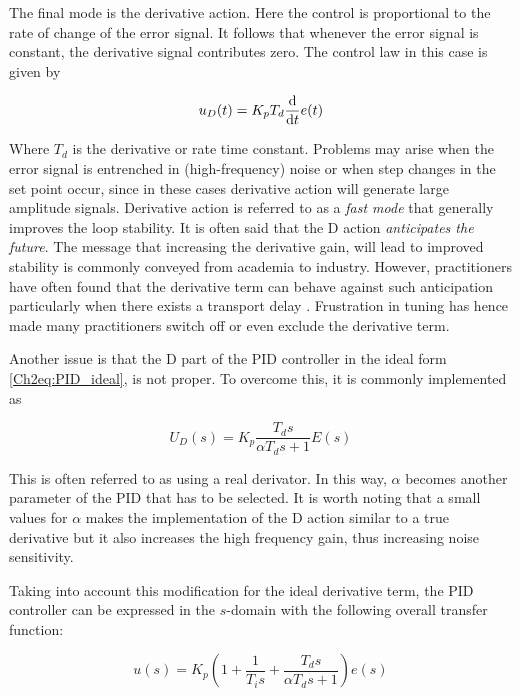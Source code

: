 The final mode is the derivative  action. Here the control is proportional to the rate of change of the error signal. It follows that whenever the error signal is constant, the derivative signal contributes zero. The control law in this case is given by

\[u_D(t) = K_pT_d \frac{\mathrm{d}}{\mathrm{d} t}e(t)\]

Where $T_d$ is the derivative or rate time constant. Problems may arise when the error signal is entrenched in (high-frequency) noise or when step changes in the set point occur, since in these cases derivative action will generate large amplitude signals. Derivative action is referred to as a \emph{fast mode} that generally improves the loop stability. It is often said that the D action \emph{anticipates the future}. The message that increasing the derivative gain, will lead to improved stability is commonly conveyed from academia to industry. However, practitioners have often found that the derivative term can behave against such anticipation particularly when there exists a transport delay \citep{VilanovaBook2012}. Frustration in tuning  has hence made many practitioners switch off or even exclude the derivative term.  


Another issue is that the D part of the PID controller in the ideal form \eqref{Ch2eq:PID_ideal},  is not proper. To overcome this, it is commonly implemented as

\[U_D(s)= K_p\frac{T_ds}{\alpha T_d s+1} E(s)\]

This is often referred to as using a real derivator. In this way, $\alpha$ becomes another parameter of the PID that has to be selected. It is worth noting that a small values for $\alpha$ makes the implementation of the D action similar to a true derivative but it also increases the high frequency gain, thus increasing noise sensitivity.

Taking into account this modification for the ideal derivative term, the PID controller can be expressed in the $s$-domain with the following overall transfer function:

\begin{equation}
u(s)=K_p \left ( 1+\frac{1}{T_is}+\frac{T_ds}{\alpha T_d s+1} \right )  e(s)
\end{equation}

